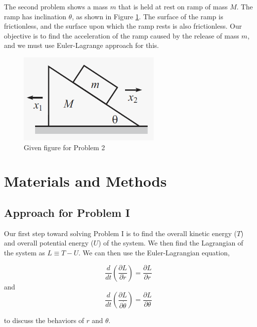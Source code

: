 \documentclass[conference]{IEEEtran}
\begin{document}
The second problem shows a mass $m$ that is held at rest on ramp of mass $M$. The ramp has inclination
$\theta$, as shown in Figure \ref{problem-2-given-fig}. The surface of the ramp is frictionless, and the
surface upon which the ramp rests is also frictionless. Our objective is to find the acceleration of
the ramp caused by the release of mass $m$, and we must use Euler-Lagrange approach for this.

\begin{figure}
    \centering
    \includegraphics[scale=0.35]{problem-2-given-fig.png}
    \caption{Given figure for Problem 2}
    \label{problem-2-given-fig}
\end{figure}

\section{Materials and Methods}

\subsection{Approach for Problem I}

Our first step toward solving Problem I is to find the overall kinetic energy ($T$) and
overall potential energy ($U$) of the system. We then find the Lagrangian of the system
as $L \equiv T - U$. We can then use the Euler-Lagrangian equation,

\begin{equation} \label{prob1_eq_motion_r}
    \frac{d}{dt} \left(\frac{\partial L}{\partial \dot{r}}\right) = \frac{\partial L}{ \partial r}
\end{equation}
and
\begin{equation} \label{prob1_eq_motion_theta}
    \frac{d}{dt} \left(\frac{\partial L}{\partial \dot{\theta}}\right) = \frac{\partial L}{ \partial \theta}
\end{equation}

to discuss the behaviors of $r$ and $\theta$.\\
\end{document}
